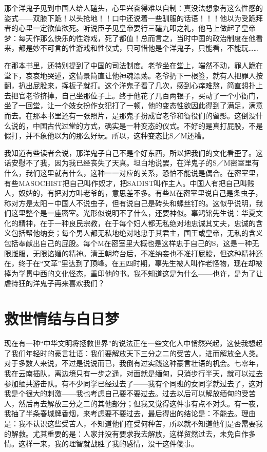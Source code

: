 那个洋鬼子见到中国人给人磕头，心里兴奋得难以自制：真没法想象有这么性感的姿式——双膝下跪！以头抢地！！口中还说着一些驯服的话语！！！他以为受跪拜者的心里一定欲仙欲死。听说臣子见皇帝要行三磕九叩之礼，他马上做起了皇帝梦：每天作那么快乐的性游戏，死了都值！总而言之，当时中国的政治制度在他看来，都是妙不可言的性游戏和性仪式，只可惜他是个洋鬼子，只能看，不能玩…… 

在那本书里，还特别提到了中国的司法制度。老爷坐在堂上，端然不动，罪人跪在堂下，哀哀地哭述，这情景简直让他神魂漂荡。老爷扔下一根签，就有人把罪人按翻，扒出屁股来，挥板子就打。这个洋鬼子看了几次，感到心痒难熬，简直想扑上去把官老爷挤掉，自己坐那位子上。终于他花了几百两银子，买动了一个小衙门，坐了一回堂，让一个妓女扮作女犯打了一顿，他的变态性欲因此得到了满足，满意而去。在那本书里还有一张照片，是那鬼子扮成官老爷和衙役们的留影。这倒没什么说的，中国古代过堂的方式，确实是一种变态的仪式。不好的是真打屁股，不是假打，并不象他以为的那么好玩。所以，这种变态比S／M还糟。 

我知道有些读者会说，那洋鬼子自己不是个好东西，所以把我们的文化看歪了。这话安慰不了我，因为我已经丧失了天真。坦白地说罢，在洋鬼子的S／M密室里有什么，我们这里就有什么，这种一一对应的关系，恐怕不能说是偶合。在密室里，有些MASOCHIST把自己叫作奴才，把SADIST叫作主人。中国人有把自己叫贱人，奴婢的，有把对方叫老爷的，意思差不多。有些M在密室里说自己是条虫子，称对方是太阳－中国人不说虫子，但有说自己是砖头和螺丝钉的。这似乎说明，我们这里整个是一座密室。光形似说明不了什么，还要神似。辜鸿铭先生说：华夏文化的精神，在于一种良民宗教，在于每个妇人都无私绝对地忠诚其丈夫，忠诚的含义包括帮他纳妾；每个男人都无私地绝对地忠于其君主，国王或皇帝，无私的含义包括奉献出自己的屁股。每个M在密室里大概也是这样忠于自己的S，这是一种无限雌服，无限谄媚的精神。清王朝垮台后，不准纳妾也不准打屁股，但这种精神还在，终于在“文革”里达到了顶峰。在五四时期，辜先生被人叫作老怪物，现在却被捧为学贯中西的文化怪杰，重印他的书。我不知道这是为什么——也许，是为了让虐待狂的洋鬼子再来喜欢我们？

\chapter{救世情结与白日梦}

现在有一种“中华文明将拯救世界”的说法正在一些文化人中悄然兴起，这使我想起了我们年轻时的豪言壮语：我们要解放天下三分之二的受苦人，进而解放全人类。对于多数人来说，不过是说说而已，我倒有过实践这种豪言壮语的机会。七零年，我在云南插队，离边境只有一步之遥，对面就是缅甸，只消步行半天，就可以过去参加缅共游击队。有不少同学已经过去了——我有个同班的女同学就过去了，这对我是个很大的刺激——我也考虑自己要不要过去。过去以后可以解放缅甸的受苦人，然后再去解放三分之二的其他部分；但我又觉得这件事有点不对头。有一夜，我抽了半条春城牌香烟，来考虑要不要过去，最后得出的结论是：不能去。理由是：我不认识这些受苦人，不知道他们在受何种苦，所以就不知道他们是否需要我的解救。尤其重要的是：人家并没有要求我去解放，这样贸然过去，未免自作多情。这样一来，我的理智就战胜了我的感情，没干这件傻事。 

